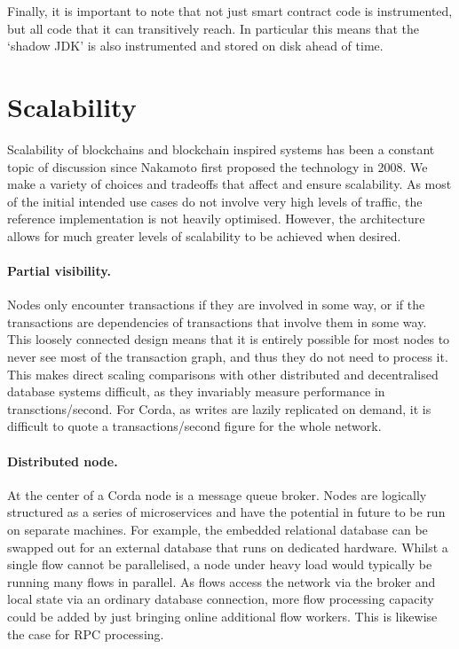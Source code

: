 \documentclass{article}
\begin{document}
Finally, it is important to note that not just smart contract code is instrumented, but all code that it can transitively
reach. In particular this means that the `shadow JDK' is also instrumented and stored on disk ahead of time.

\section{Scalability}

Scalability of blockchains and blockchain inspired systems has been a constant topic of discussion since Nakamoto
first proposed the technology in 2008. We make a variety of choices and tradeoffs that affect and
ensure scalability. As most of the initial intended use cases do not involve very high levels of traffic, the
reference implementation is not heavily optimised. However, the architecture allows for much greater levels of
scalability to be achieved when desired.

\paragraph{Partial visibility.}Nodes only encounter transactions if they are involved in some way, or if the
transactions are dependencies of transactions that involve them in some way. This loosely connected
design means that it is entirely possible for most nodes to never see most of the transaction graph, and thus
they do not need to process it. This makes direct scaling comparisons with other distributed and
decentralised database systems difficult, as they invariably measure performance in transctions/second.
For Corda, as writes are lazily replicated on demand, it is difficult to quote a transactions/second figure for
the whole network.

\paragraph{Distributed node.}At the center of a Corda node is a message queue broker. Nodes are logically structured
as a series of microservices and have the potential in future to be run on separate machines. For example, the
embedded relational database can be swapped out for an external database that runs on dedicated hardware. Whilst
a single flow cannot be parallelised, a node under heavy load would typically be running many flows in parallel.
As flows access the network via the broker and local state via an ordinary database connection, more flow processing
capacity could be added by just bringing online additional flow workers. This is likewise the case for RPC processing.
\end{document}
